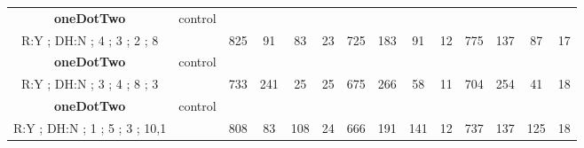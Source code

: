 \begin{table}[]
{\begin{tabular}{|c|c|c|c|c|c|c|c|c|c|c|c|c|c|}
\cellcolor{blue!15}\textbf{oneDotTwo} & control& {\color[HTML]{00009B} } & {\color[HTML]{9A0000} } & {\color[HTML]{009901} } &  & {\color[HTML]{00009B} } & {\color[HTML]{9A0000} } & {\color[HTML]{009901} } &  & {\color[HTML]{00009B} } & {\color[HTML]{9A0000} } & {\color[HTML]{009901} } &  \\ 
\cellcolor{ blue!15}R:Y ; DH:N ; 4 ; 3 ; 2 ; 8 &  & \multirow{-2}{*}{{\color[HTML]{00009B} 825}} & \multirow{-2}{*}{{\color[HTML]{9A0000} 91}} & \multirow{-2}{*}{{\color[HTML]{009901} 83}} & \multirow{-2}{*}{23} & \multirow{-2}{*}{{\color[HTML]{00009B} 725}} & \multirow{-2}{*}{{\color[HTML]{9A0000} 183}} & \multirow{-2}{*}{{\color[HTML]{009901} 91}} & \multirow{-2}{*}{12} & \multirow{-2}{*}{{\color[HTML]{00009B} 775}} & \multirow{-2}{*}{{\color[HTML]{9A0000} 137}} & \multirow{-2}{*}{{\color[HTML]{009901} 87}} & \multirow{-2}{*}{17} \\ \hline

\cellcolor{blue!15}\textbf{oneDotTwo} & control& {\color[HTML]{00009B} } & {\color[HTML]{9A0000} } & {\color[HTML]{009901} } &  & {\color[HTML]{00009B} } & {\color[HTML]{9A0000} } & {\color[HTML]{009901} } &  & {\color[HTML]{00009B} } & {\color[HTML]{9A0000} } & {\color[HTML]{009901} } &  \\ 
\cellcolor{ blue!15}R:Y ; DH:N ; 3 ; 4 ; 8 ; 3 &  & \multirow{-2}{*}{{\color[HTML]{00009B} 733}} & \multirow{-2}{*}{{\color[HTML]{9A0000} 241}} & \multirow{-2}{*}{{\color[HTML]{009901} 25}} & \multirow{-2}{*}{25} & \multirow{-2}{*}{{\color[HTML]{00009B} 675}} & \multirow{-2}{*}{{\color[HTML]{9A0000} 266}} & \multirow{-2}{*}{{\color[HTML]{009901} 58}} & \multirow{-2}{*}{11} & \multirow{-2}{*}{{\color[HTML]{00009B} 704}} & \multirow{-2}{*}{{\color[HTML]{9A0000} 254}} & \multirow{-2}{*}{{\color[HTML]{009901} 41}} & \multirow{-2}{*}{18} \\ \hline

\cellcolor{blue!15}\textbf{oneDotTwo} & control& {\color[HTML]{00009B} } & {\color[HTML]{9A0000} } & {\color[HTML]{009901} } &  & {\color[HTML]{00009B} } & {\color[HTML]{9A0000} } & {\color[HTML]{009901} } &  & {\color[HTML]{00009B} } & {\color[HTML]{9A0000} } & {\color[HTML]{009901} } &  \\ 
\cellcolor{ blue!15}R:Y ; DH:N ; 1 ; 5 ; 3 ; 10,1 &  & \multirow{-2}{*}{{\color[HTML]{00009B} 808}} & \multirow{-2}{*}{{\color[HTML]{9A0000} 83}} & \multirow{-2}{*}{{\color[HTML]{009901} 108}} & \multirow{-2}{*}{24} & \multirow{-2}{*}{{\color[HTML]{00009B} 666}} & \multirow{-2}{*}{{\color[HTML]{9A0000} 191}} & \multirow{-2}{*}{{\color[HTML]{009901} 141}} & \multirow{-2}{*}{12} & \multirow{-2}{*}{{\color[HTML]{00009B} 737}} & \multirow{-2}{*}{{\color[HTML]{9A0000} 137}} & \multirow{-2}{*}{{\color[HTML]{009901} 125}} & \multirow{-2}{*}{18} \\ \hline


\end{tabular}}
\end{table}
